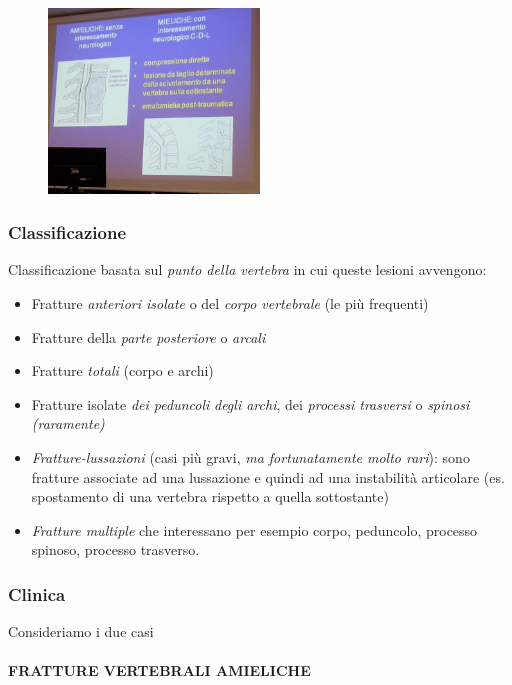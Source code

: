 \begin{figure}[!ht]
\centering
\includegraphics[width=0.5\textwidth]{003/image1.jpeg}
\end{figure}

\subsubsection{Classificazione}

Classificazione basata sul \emph{punto della vertebra} in cui queste lesioni avvengono:

\begin{itemize}
\item
  Fratture \emph{anteriori isolate} o del \emph{corpo vertebrale} (le più frequenti)
\item
  Fratture della \emph{parte posteriore} o \emph{arcali}
\item
  Fratture \emph{totali} (corpo e archi)
\item
  Fratture isolate \emph{dei peduncoli} \emph{\emph{degli archi}}, dei
  \emph{processi trasversi} o \emph{spinosi (raramente)}
\item
  \emph{Fratture-lussazioni} (casi più gravi, \emph{ma fortunatamente molto rari}): sono fratture associate ad una lussazione e quindi ad una instabilità articolare (es. spostamento di una vertebra rispetto a quella sottostante)
\item
  \emph{Fratture multiple} che interessano per esempio corpo, peduncolo, processo spinoso, processo trasverso.
\end{itemize}

\subsubsection{Clinica}

Consideriamo i due casi

\paragraph{FRATTURE VERTEBRALI AMIELICHE}

